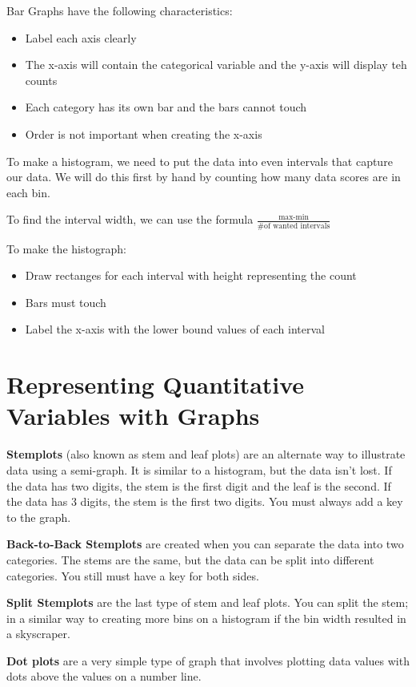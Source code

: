 \documentclass[../stats.tex]{subfiles}
\begin{document}
Bar Graphs have the following characteristics:
\begin{itemize}
    \item Label each axis clearly
    \item The x-axis will contain the categorical variable and the y-axis will display teh counts
    \item Each category has its own bar and the bars cannot touch
    \item Order is not important when creating the x-axis
\end{itemize}
To make a histogram, we need to put the data into even intervals that capture our data. We will do this first by hand by counting how many data scores are in each bin.

To find the interval width, we can use the formula $\frac{\text{max-min}}{\text{\# of wanted intervals}}$

To make the histograph:
\begin{itemize}
    \item Draw rectanges for each interval with height representing the count
    \item Bars must touch
    \item Label the x-axis with the lower bound values of each interval
\end{itemize}
\section{Representing Quantitative Variables with Graphs}
\textbf{Stemplots} (also known as stem and leaf plots) are an alternate way to illustrate data using a semi-graph. It is similar to a histogram, but the data isn't lost. If the data has two digits, the stem is the first digit and the leaf is the second. If the data has 3 digits, the stem is the first two digits. You must always add a key to the graph.

\textbf{Back-to-Back Stemplots} are created when you can separate the data into two categories. The stems are the same, but the data can be split into different categories. You still must have a key for both sides.

\textbf{Split Stemplots} are the last type of stem and leaf plots. You can split the stem; in a similar way to creating more bins on a histogram if the bin width resulted in a skyscraper.

\textbf{Dot plots} are a very simple type of graph that involves plotting data values with dots above the values on a number line.
\end{document}

